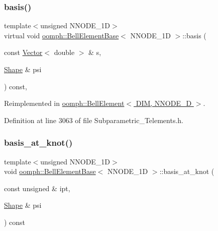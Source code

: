 \subsubsection{\texorpdfstring{basis()}{basis()}}
{\footnotesize\ttfamily template$<$unsigned N\+N\+O\+D\+E\+\_\+1D$>$ \\
virtual void \hyperlink{classoomph_1_1BellElementBase}{oomph\+::\+Bell\+Element\+Base}$<$ N\+N\+O\+D\+E\+\_\+1D $>$\+::basis (\begin{DoxyParamCaption}\item[{const \hyperlink{classoomph_1_1Vector}{Vector}$<$ double $>$ \&}]{s,  }\item[{\hyperlink{classoomph_1_1Shape}{Shape} \&}]{psi }\end{DoxyParamCaption}) const\hspace{0.3cm}{\ttfamily [inline]}, {\ttfamily [virtual]}}



Reimplemented in \hyperlink{classoomph_1_1BellElement_a31a6dfd140d030104094a333d4331dbc}{oomph\+::\+Bell\+Element$<$ D\+I\+M, N\+N\+O\+D\+E\+\_\+D $>$}.



Definition at line 3063 of file Subparametric\+\_\+\+Telements.\+h.

\mbox{\label{classoomph_1_1BellElementBase_af00e238530de6269b51b57a4357d1dd6}} 
\subsubsection{\texorpdfstring{basis\+\_\+at\+\_\+knot()}{basis\_at\_knot()}}
{\footnotesize\ttfamily template$<$unsigned N\+N\+O\+D\+E\+\_\+1D$>$ \\
void \hyperlink{classoomph_1_1BellElementBase}{oomph\+::\+Bell\+Element\+Base}$<$ N\+N\+O\+D\+E\+\_\+1D $>$\+::basis\+\_\+at\+\_\+knot (\begin{DoxyParamCaption}\item[{const unsigned \&}]{ipt,  }\item[{\hyperlink{classoomph_1_1Shape}{Shape} \&}]{psi }\end{DoxyParamCaption}) const\hspace{0.3cm}{\ttfamily [inline]}}



